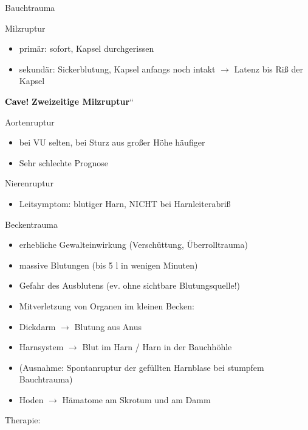 \documentclass{article}
\newcommand\gEs[1]{\textbf{\textcolor[rgb]{0.0,0.0,0.5019608}{#1}}}
\newcommand\gEs[1]{\textbf{\textcolor[rgb]{0.0,0.0,0.5019608}{#1}}}
\newcommand\gCa[1]{\textbf{\textcolor{black}{#1}}}
\begin{document}
{\mdseries
Bauchtrauma}

{\mdseries\color{black}
Milzruptur}

\begin{itemize}
\item {\mdseries
prim\"ar: sofort, Kapsel durchgerissen}

\item {\mdseries
sekund\"ar: Sickerblutung, Kapsel anfangs noch intakt ${\rightarrow}$
Latenz bis Ri{\ss} der Kapsel}

\end{itemize}
{\mdseries\color{black}
\gCa{Cave!} {\quotedblbase}\gEs{Zweizeitige
Milzruptur}{\textquotedblleft}}

{\mdseries\color{black}
Aortenruptur}

\begin{itemize}
\item {\mdseries
bei VU selten, bei Sturz aus gro{\ss}er H\"ohe  h\"aufiger}

\item {\mdseries
Sehr schlechte Prognose}

\end{itemize}
{\mdseries\color{black}
Nierenruptur}

\begin{itemize}
\item {\mdseries
Leitsymptom: blutiger Harn, NICHT bei  Harnleiterabri{\ss}}

\end{itemize}
{\mdseries\color{black}
Beckentrauma}

\begin{itemize}
\item {\mdseries
erhebliche Gewalteinwirkung  (Versch\"uttung, \"Uberrolltrauma)}

\item {\mdseries
massive  Blutungen (bis 5 l in wenigen  Minuten)}

\item {\mdseries
Gefahr des Ausblutens (ev. ohne sichtbare  Blutungsquelle!)}

\item {\mdseries
Mitverletzung von Organen im kleinen  Becken:}

\end{itemize}
\begin{itemize}
\item {\mdseries
Dickdarm ${\rightarrow}$ Blutung aus Anus}

\item {\mdseries
Harnsystem ${\rightarrow}$ Blut im Harn / Harn in der  Bauchh\"ohle}

\item {\mdseries
(Ausnahme: Spontanruptur der gef\"ullten  Harnblase bei stumpfem
Bauchtrauma)}

\item {\mdseries
Hoden ${\rightarrow}$ H\"amatome am Skrotum und am  Damm}

\end{itemize}
{\mdseries\color{black}
Therapie:}
\end{document}
